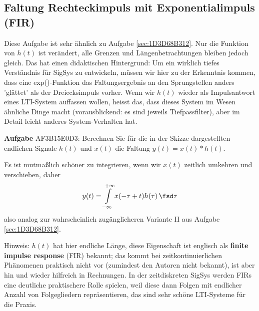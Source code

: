 \clearpage
\subsection{Faltung Rechteckimpuls mit Exponentialimpuls (FIR)}
\label{sec:AF3B15E0D3}
\begin{Ziel}
Diese Aufgabe ist sehr ähnlich zu Aufgabe \ref{sec:1D3D68B312}.
Nur die Funktion von $h(t)$ ist verändert, alle Grenzen und
Längenbetrachtungen bleiben jedoch gleich. Das hat einen didaktischen
Hintergrund: Um ein wirklich tiefes Verständnis für SigSys zu entwickeln, müssen wir hier zu der Erkenntnis kommen, dass eine exp()-Funktion
das Faltungsergebnis an den Sprungstellen anders 'glättet' als der Dreiecksimpuls
vorher.
Wenn wir $h(t)$ wieder als Impulsantwort eines LTI-System auffassen wollen,
heisst das, dass dieses System im Wesen ähnliche Dinge macht (vorausblickend: es sind jeweils Tiefpassfilter), aber im Detail
leicht anderes System-Verhalten hat.
\end{Ziel}
\textbf{Aufgabe} {\tiny AF3B15E0D3}: Berechnen Sie für die in der Skizze dargestellten
endlichen Signale $h(t)$ und $x(t)$ die Faltung $y(t)=x(t) \ast h(t)$.




\begin{Werkzeug}
Es ist mutmaßlich schöner zu integrieren, wenn wir $x(t)$ zeitlich umkehren und
verschieben, daher
\begin{equation}
y(t) = \int\limits_{-\infty}^{+\infty} x(-\tau+t) h(\tau) \, \fsd \tau
\end{equation}
also analog zur wahrscheinlich zugänglicheren Variante II aus Aufgabe
\ref{sec:1D3D68B312}.

Hinweis: $h(t)$ hat hier endliche Länge, diese Eigenschaft ist englisch als \textbf{finite impulse response} (FIR) bekannt; das kommt bei zeitkontinuierlichen Phänomenen praktisch nicht vor (zumindest den Autoren nicht bekannt), ist aber hin und wieder hilfreich in Rechnungen. In der zeitdiskreten SigSys werden FIRs eine deutliche praktischere Rolle spielen, weil diese dann Folgen mit endlicher Anzahl von Folgegliedern repräsentieren, das sind sehr schöne LTI-Systeme für die Praxis.
\end{Werkzeug}


